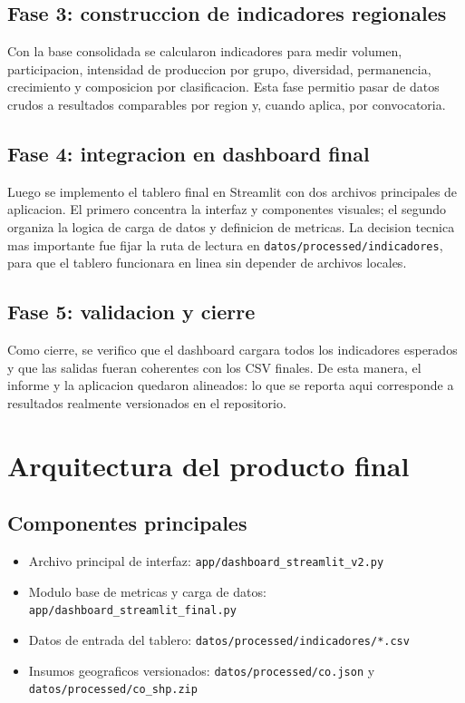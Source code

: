 \documentclass[12pt,letterpaper]{article}
\begin{document}
\subsection{Fase 3: construccion de indicadores regionales}

Con la base consolidada se calcularon indicadores para medir volumen, participacion, intensidad de produccion por grupo, diversidad, permanencia, crecimiento y composicion por clasificacion. Esta fase permitio pasar de datos crudos a resultados comparables por region y, cuando aplica, por convocatoria.

\subsection{Fase 4: integracion en dashboard final}

Luego se implemento el tablero final en Streamlit con dos archivos principales de aplicacion. El primero concentra la interfaz y componentes visuales; el segundo organiza la logica de carga de datos y definicion de metricas. La decision tecnica mas importante fue fijar la ruta de lectura en \texttt{datos/processed/indicadores}, para que el tablero funcionara en linea sin depender de archivos locales.

\subsection{Fase 5: validacion y cierre}

Como cierre, se verifico que el dashboard cargara todos los indicadores esperados y que las salidas fueran coherentes con los CSV finales. De esta manera, el informe y la aplicacion quedaron alineados: lo que se reporta aqui corresponde a resultados realmente versionados en el repositorio.

\section{Arquitectura del producto final}

\subsection{Componentes principales}

\begin{itemize}
  \item Archivo principal de interfaz: \texttt{app/dashboard\_streamlit\_v2.py}
  \item Modulo base de metricas y carga de datos: \texttt{app/dashboard\_streamlit\_final.py}
  \item Datos de entrada del tablero: \texttt{datos/processed/indicadores/*.csv}
  \item Insumos geograficos versionados: \texttt{datos/processed/co.json} y \texttt{datos/processed/co\_shp.zip}
\end{itemize}
\end{document}
